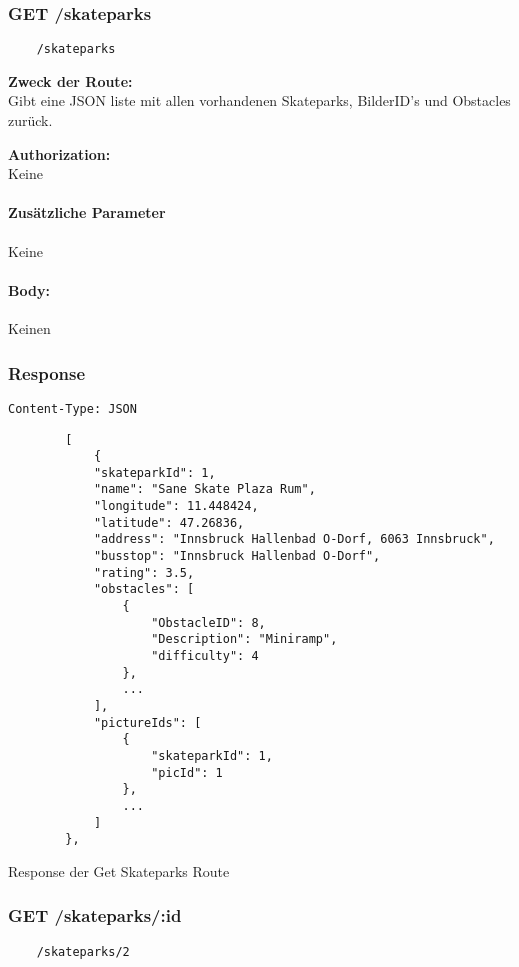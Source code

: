 \label{/skateparks}

\subsubsection{GET /skateparks}

\begin{lstlisting}
    /skateparks
\end{lstlisting}

\textbf{Zweck der Route:} \\
Gibt  eine JSON liste mit allen vorhandenen Skateparks,  BilderID's und
Obstacles zurück.

\textbf{Authorization:} \\
Keine

\paragraph{Zusätzliche Parameter}
Keine

\paragraph{Body:}

Keinen

\subsubsection{Response}
\begin{code}
    \lstinline{Content-Type: JSON}
    \begin{lstlisting}
        [
            {
            "skateparkId": 1,
            "name": "Sane Skate Plaza Rum",
            "longitude": 11.448424,
            "latitude": 47.26836,
            "address": "Innsbruck Hallenbad O-Dorf, 6063 Innsbruck",
            "busstop": "Innsbruck Hallenbad O-Dorf",
            "rating": 3.5,
            "obstacles": [
                {
                    "ObstacleID": 8,
                    "Description": "Miniramp",
                    "difficulty": 4
                },
                ...
            ],
            "pictureIds": [
                {
                    "skateparkId": 1,
                    "picId": 1
                },
                ...
            ]
        },
    \end{lstlisting}
    \caption{Response der Get Skateparks Route}
\end{code}

\pagebreak

\subsubsection{GET /skateparks/:id}
\begin{lstlisting}
    /skateparks/2
\end{lstlisting}


